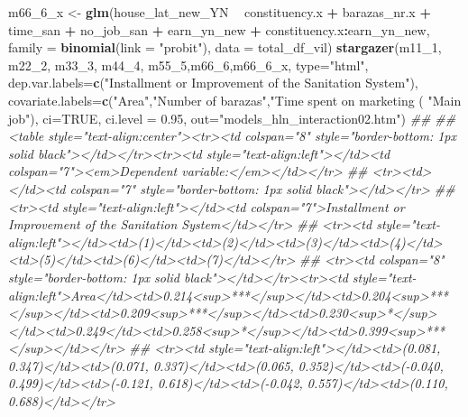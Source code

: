 \documentclass[
]{article}
\newenvironment{Shaded}{\begin{snugshade}}{\end{snugshade}}
\newcommand{\CommentTok}[1]{\textcolor[rgb]{0.56,0.35,0.01}{\textit{#1}}}
\newcommand{\DataTypeTok}[1]{\textcolor[rgb]{0.13,0.29,0.53}{#1}}
\newcommand{\DecValTok}[1]{\textcolor[rgb]{0.00,0.00,0.81}{#1}}
\newcommand{\FloatTok}[1]{\textcolor[rgb]{0.00,0.00,0.81}{#1}}
\newcommand{\KeywordTok}[1]{\textcolor[rgb]{0.13,0.29,0.53}{\textbf{#1}}}
\newcommand{\NormalTok}[1]{#1}
\newcommand{\OperatorTok}[1]{\textcolor[rgb]{0.81,0.36,0.00}{\textbf{#1}}}
\newcommand{\OtherTok}[1]{\textcolor[rgb]{0.56,0.35,0.01}{#1}}
\newcommand{\StringTok}[1]{\textcolor[rgb]{0.31,0.60,0.02}{#1}}
\begin{document}
\begin{Shaded}
\begin{Highlighting}[]
{{{{{{{{{{{{{{\NormalTok{m66_}\DecValTok{6}\NormalTok{_x <-}\StringTok{ }\KeywordTok{glm}\NormalTok{(house_lat_new_YN }\OperatorTok{~}\StringTok{ }\NormalTok{constituency.x }\OperatorTok{+}\StringTok{ }\NormalTok{barazas_nr.x }\OperatorTok{+}\StringTok{ }\NormalTok{time_san }\OperatorTok{+}\StringTok{ }\NormalTok{no_job_san }\OperatorTok{+}\StringTok{ }\NormalTok{earn_yn_new }\OperatorTok{+}\StringTok{ }\NormalTok{constituency.x}\OperatorTok{:}\NormalTok{earn_yn_new, }\DataTypeTok{family =} \KeywordTok{binomial}\NormalTok{(}\DataTypeTok{link =} \StringTok{"probit"}\NormalTok{), }\DataTypeTok{data =}\NormalTok{ total_df_vil)}
\KeywordTok{stargazer}\NormalTok{(m11_}\DecValTok{1}\NormalTok{, m22_}\DecValTok{2}\NormalTok{, m33_}\DecValTok{3}\NormalTok{, m44_}\DecValTok{4}\NormalTok{, m55_}\DecValTok{5}\NormalTok{,m66_}\DecValTok{6}\NormalTok{,m66_}\DecValTok{6}\NormalTok{_x, }\DataTypeTok{type=}\StringTok{"html"}\NormalTok{,}
          \DataTypeTok{dep.var.labels=}\KeywordTok{c}\NormalTok{(}\StringTok{"Installment or Improvement of the Sanitation System"}\NormalTok{),}
          \DataTypeTok{covariate.labels=}\KeywordTok{c}\NormalTok{(}\StringTok{"Area"}\NormalTok{,}\StringTok{"Number of barazas"}\NormalTok{,}\StringTok{"Time spent on marketing (%) "}\NormalTok{,}
                             \StringTok{"Main job"}\NormalTok{), }\DataTypeTok{ci=}\OtherTok{TRUE}\NormalTok{, }\DataTypeTok{ci.level =} \FloatTok{0.95}\NormalTok{, }\DataTypeTok{out=}\StringTok{"models_hln_interaction02.htm"}\NormalTok{)}
\CommentTok{## }
\CommentTok{## <table style="text-align:center"><tr><td colspan="8" style="border-bottom: 1px solid black"></td></tr><tr><td style="text-align:left"></td><td colspan="7"><em>Dependent variable:</em></td></tr>}
\CommentTok{## <tr><td></td><td colspan="7" style="border-bottom: 1px solid black"></td></tr>}
\CommentTok{## <tr><td style="text-align:left"></td><td colspan="7">Installment or Improvement of the Sanitation System</td></tr>}
\CommentTok{## <tr><td style="text-align:left"></td><td>(1)</td><td>(2)</td><td>(3)</td><td>(4)</td><td>(5)</td><td>(6)</td><td>(7)</td></tr>}
\CommentTok{## <tr><td colspan="8" style="border-bottom: 1px solid black"></td></tr><tr><td style="text-align:left">Area</td><td>0.214<sup>***</sup></td><td>0.204<sup>***</sup></td><td>0.209<sup>***</sup></td><td>0.230<sup>*</sup></td><td>0.249</td><td>0.258<sup>*</sup></td><td>0.399<sup>***</sup></td></tr>}
\CommentTok{## <tr><td style="text-align:left"></td><td>(0.081, 0.347)</td><td>(0.071, 0.337)</td><td>(0.065, 0.352)</td><td>(-0.040, 0.499)</td><td>(-0.121, 0.618)</td><td>(-0.042, 0.557)</td><td>(0.110, 0.688)</td></tr>}
}}}}}}}}}}}}}}}
\end{Highlighting}
\end{Shaded}
\end{document}
